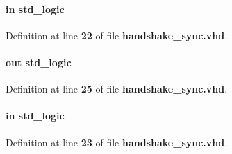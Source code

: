 \paragraph[{dst\+\_\+clk}]{ {\bfseries \textcolor{keywordflow}{in}\textcolor{vhdlchar}{ }} {\bfseries \textcolor{comment}{std\+\_\+logic}\textcolor{vhdlchar}{ }} \hspace{0.3cm}{\ttfamily [Port]}}\label{classhandshake__sync_a098f4266d77302e1ddb445907e5efac3}


Definition at line {\bf 22} of file {\bf handshake\+\_\+sync.\+vhd}.

\paragraph[{dst\+\_\+out}]{ {\bfseries \textcolor{keywordflow}{out}\textcolor{vhdlchar}{ }} {\bfseries \textcolor{comment}{std\+\_\+logic}\textcolor{vhdlchar}{ }} \hspace{0.3cm}{\ttfamily [Port]}}\label{classhandshake__sync_acc79966a552bec4070abcb90648ad660}


Definition at line {\bf 25} of file {\bf handshake\+\_\+sync.\+vhd}.

\paragraph[{dst\+\_\+reset\+\_\+n}]{ {\bfseries \textcolor{keywordflow}{in}\textcolor{vhdlchar}{ }} {\bfseries \textcolor{comment}{std\+\_\+logic}\textcolor{vhdlchar}{ }} \hspace{0.3cm}{\ttfamily [Port]}}\label{classhandshake__sync_aad1317a7600dc51f597fd4d1a84cdabb}


Definition at line {\bf 23} of file {\bf handshake\+\_\+sync.\+vhd}.

\paragraph[{ieee}]{\hspace{0.3cm}{\ttfamily [Library]}}\label{classhandshake__sync_a0a6af6eef40212dbaf130d57ce711256}


